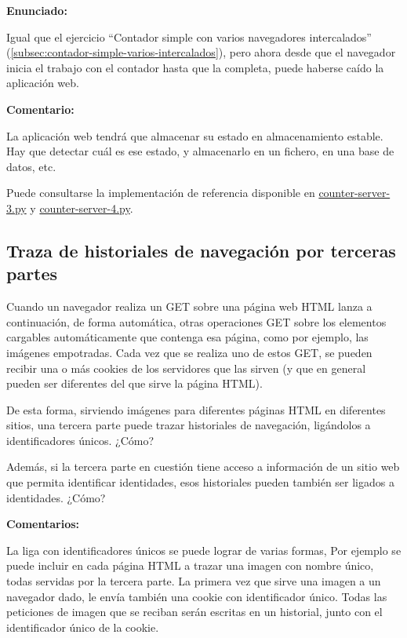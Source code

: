 \textbf{Enunciado:}

Igual que el ejercicio ``Contador simple con varios navegadores intercalados'' (\ref{subsec:contador-simple-varios-intercalados}), pero ahora desde que el navegador inicia el trabajo con el contador hasta que la completa, puede haberse caído la aplicación web.

\textbf{Comentario:}

La aplicación web tendrá que  almacenar su estado en almacenamiento estable. Hay que detectar cuál es ese estado, y almacenarlo en  un fichero, en  una base de datos, etc.

Puede consultarse la implementación de referencia disponible en
\href{https://github.com/CursosWeb/Code/blob/master/Python-Web/counter/counter-server-3.py}{counter-server-3.py} y
\href{https://github.com/CursosWeb/Code/blob/master/Python-Web/counter/counter-server-4.py}{counter-server-4.py}.


\subsection{Traza de historiales de navegación por terceras partes}
\label{subsec:navegacion-terceras-partes}

Cuando un navegador realiza un GET sobre una página web HTML lanza a continuación, de forma automática, otras operaciones GET sobre los elementos cargables automáticamente que contenga esa página, como por ejemplo, las imágenes empotradas. Cada vez que se realiza uno de estos GET, se pueden recibir una o más cookies de los servidores que las sirven (y que en general pueden ser diferentes del que sirve la página HTML).

De esta forma, sirviendo imágenes para diferentes páginas HTML en diferentes sitios, una tercera parte puede trazar historiales de navegación, ligándolos a identificadores únicos. ¿Cómo?

Además, si la tercera parte en cuestión tiene acceso a información de un sitio web que permita identificar identidades, esos historiales pueden también ser ligados a identidades. ¿Cómo?

\textbf{Comentarios:}

La liga con identificadores únicos se puede lograr de varias formas, Por ejemplo se puede incluir en cada página HTML a trazar una imagen con nombre único, todas servidas por la tercera parte. La primera vez que sirve una imagen a un navegador dado, le envía también una cookie con identificador único. Todas las peticiones de imagen que se reciban serán escritas en un historial, junto con el identificador único de la cookie.

